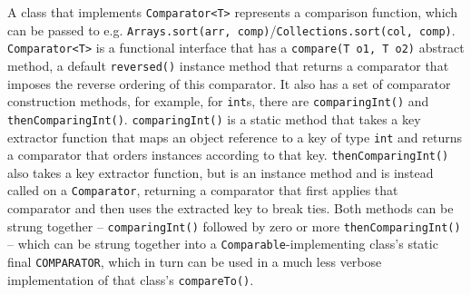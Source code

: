 \documentclass[8pt, table, xcdraw]{article}%
\begin{document}
A class that implements \lstinline{Comparator<T>} represents a comparison function, which can be passed to e.g. \lstinline{Arrays.sort(arr, comp)}/\lstinline{Collections.sort(col, comp)}. \lstinline{Comparator<T>} is a functional interface that has a \lstinline{compare(T o1, T o2)} abstract method, a default \lstinline{reversed()} instance method that returns a comparator that imposes the reverse ordering of this comparator. It also has a set of comparator construction methods, for example, for \lstinline{int}s, there are \lstinline{comparingInt()} and \lstinline{thenComparingInt()}. \lstinline{comparingInt()} is a static method that takes a key extractor function that maps an object reference to a key of type \lstinline{int} and returns a comparator that orders instances according to that key. \lstinline{thenComparingInt()} also takes a key extractor function, but is an instance method and is instead called on a \lstinline{Comparator}, returning a comparator that first applies that comparator and then uses the extracted key to break ties. Both methods can be strung together -- \lstinline{comparingInt()} followed by zero or more \lstinline{thenComparingInt()} -- which can be strung together into a \lstinline{Comparable}-implementing class's static final \lstinline{COMPARATOR}, which in turn can be used in a much less verbose implementation of that class's \lstinline{compareTo()}.\\
\end{document}
